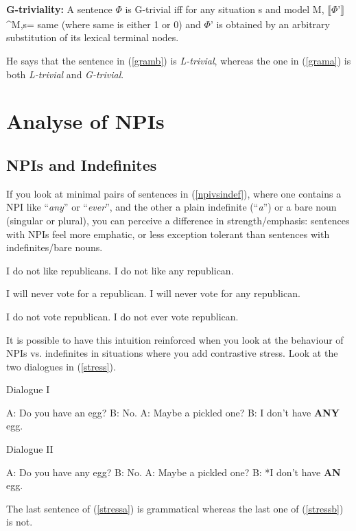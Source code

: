 \documentclass[a4paper,11pt]{article}
\newcommand{\reff}[1]{(\ref{#1})}
\newcommand{\eval}[2][]{$\llbracket$#2$\rrbracket_{#1}$}
\newcommand{\exs}[2][]{\begin{exe}\ex #1 \begin{xlist}#2\end{xlist}\end{exe}}
\begin{document}
\begin{exe}
 \ex\label{gtri} \textbf{G-triviality:} A  sentence $\Phi$ is G-trivial iff for any situation s and model M, \eval{$\Phi$'}^{M,s}= same (where same is either 1 or 0) and $\Phi$' is obtained by an arbitrary substitution of its lexical terminal nodes.
\end{exe}

He says that the sentence in \reff{gramb} is \emph{L-trivial}, whereas the one in \reff{grama} is both \emph{L-trivial} and \emph{G-trivial}.


\section{Analyse of NPIs}

\subsection{NPIs and Indefinites}
If you look at minimal pairs of sentences in \reff{npivsindef}, where one contains a NPI like \enquote{\emph{any}} or \enquote{\emph{ever}}, and the other a plain indefinite (\enquote{\emph{a}}) or a bare noun (singular or plural), you can perceive a difference in strength/emphasis: sentences with NPIs feel more emphatic, or less exception tolerant than sentences with indefinites/bare nouns.

\exs[\label{npivsindef}]{
  \ex\label{npivsindefa}
    \begin{xlist}
      \ex I do not like republicans.
      \ex I do not like any republican.
    \end{xlist}
  \ex
    \begin{xlist}
      \ex I will never vote for a republican.
      \ex I will never vote for any republican.
    \end{xlist}
  \ex
    \begin{xlist}
      \ex I do not vote republican.
      \ex I do not ever vote republican.
    \end{xlist}
}

It is possible to have this intuition reinforced when you look at the behaviour of NPIs vs. indefinites in situations where you add contrastive stress. Look at the two dialogues in \reff{stress}.

\exs[\label{stress}]{
  \ex\label{stressa} Dialogue I
    \begin{xlist}
      \ex A: Do you have an egg?
      \ex B: No.
      \ex A: Maybe a pickled one?
      \ex B: I don't have \textbf{ANY} egg.
    \end{xlist}
  \ex\label{stressb} Dialogue II
    \begin{xlist}
      \ex A: Do you have any egg?
      \ex B: No.
      \ex A: Maybe a pickled one?
      \ex B: *I don't have \textbf{AN} egg.
    \end{xlist}
}
%
The last sentence of \reff{stressa} is grammatical whereas the last one of \reff{stressb} is not.
\end{document}
